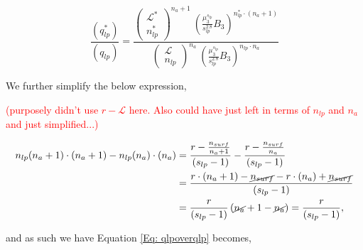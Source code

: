 \documentclass[12pt,letterpaper]{article}
\newcommand{\leng}{\mathcal{L}}
\newcommand{\lr}[1]{\left( #1 \right)}
\begin{document}
\begin{equation}
\frac{
    \lr{
        q_{lp}^{*}
    }
}{
    \lr{
        q_{lp}
    }
}
=
\frac{
        \lr{
        \begin{array}{c}
             \leng^{*}\\
             n_{lp}^{*}
        \end{array}
        }^{n_a+1}   
        ~
        \lr{
                    \frac{
                        \mu_3^{
                            s_{lp}
                        }
                    }{
                        s_{lp}^{2.8}
                    }
                    B_3
                }
                ^{
                    n_{lp}^{*}\cdot (n_a+1)
                }
}{
        \lr{
        \begin{array}{c}
             \leng\\
             n_{lp} 
        \end{array}
        }^{n_a}   
        ~
        \lr{
                    \frac{
                        \mu_3^{
                            s_{lp}
                        }
                    }{
                        s_{lp}^{2.8}
                    }
                    B_3
                }
                ^{
                    n_{lp}\cdot n_a            
        }
}
\label{Eq: qlpoverqlp}
\end{equation}

We further simplify the below expression,

\textcolor{red}{(purposely didn't use $r-\leng$ here. Also could have just left in terms of $n_{lp}$ and $n_a$ and just simplified...)} 

\begin{align}
n_{lp}(n_a+1)
\cdot
(n_a+1)
-
n_{lp}(n_a)
\cdot
(n_a)
&=
\frac{
    r
    -
    \frac{
            n_{surf}
        }{
            n_a+1
    }
}{
    (s_{lp}-1)
}
-
\frac{
    r
    -
    \frac{
        n_{surf}
    }{
        n_a
    }
}{
    (s_{lp}-1)
}\nonumber\\
&=
\frac{
    r\cdot (n_a+1)
    -
    \cancel{
        n_{surf}
    }
    -
    r\cdot (n_a)
    +
    \cancel{
        n_{surf}
    }
}{
    (s_{lp}-1)
} \\
&=
\frac{
    r
}{
    (s_{lp}-1)
}
\lr{
    \cancel{
        n_a
    }
    +
    1
    -
    \cancel{
        n_a
    }
}
=
\frac{
    r
}{
    (s_{lp}-1)
},\nonumber
\end{align}



and as such we have Equation \ref{Eq: qlpoverqlp} becomes,
\end{document}
